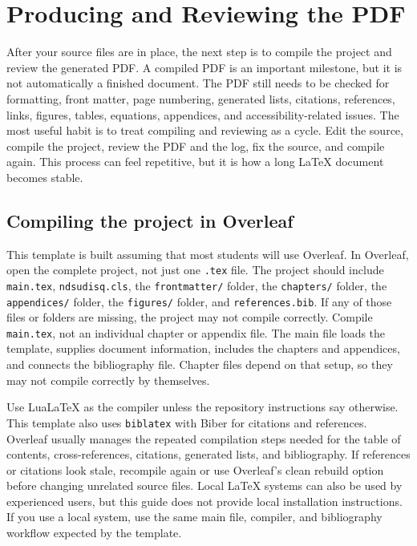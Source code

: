 \chapter{Producing and Reviewing the PDF}
\label{chap:producing-reviewing}

After your source files are in place, the next step is to compile the project and review the generated PDF. A compiled PDF is an important milestone, but it is not automatically a finished document. The PDF still needs to be checked for formatting, front matter, page numbering, generated lists, citations, references, links, figures, tables, equations, appendices, and accessibility-related issues. The most useful habit is to treat compiling and reviewing as a cycle. Edit the source, compile the project, review the PDF and the log, fix the source, and compile again. This process can feel repetitive, but it is how a long \LaTeX{} document becomes stable.

\section{Compiling the project in Overleaf}
\label{sec:compile-overleaf}

This template is built assuming that most students will use Overleaf. In Overleaf, open the complete project, not just one \texttt{.tex} file. The project should include \texttt{main.tex}, \texttt{ndsudisq.cls}, the \texttt{frontmatter/} folder, the \texttt{chapters/} folder, the \texttt{appendices/} folder, the \texttt{figures/} folder, and \texttt{references.bib}. If any of those files or folders are missing, the project may not compile correctly. Compile \texttt{main.tex}, not an individual chapter or appendix file. The main file loads the template, supplies document information, includes the chapters and appendices, and connects the bibliography file. Chapter files depend on that setup, so they may not compile correctly by themselves.

Use LuaLaTeX as the compiler unless the repository instructions say otherwise. This template also uses \texttt{biblatex} with Biber for citations and references. Overleaf usually manages the repeated compilation steps needed for the table of contents, cross-references, citations, generated lists, and bibliography. If references or citations look stale, recompile again or use Overleaf's clean rebuild option before changing unrelated source files. Local \LaTeX{} systems can also be used by experienced users, but this guide does not provide local installation instructions. If you use a local system, use the same main file, compiler, and bibliography workflow expected by the template.

